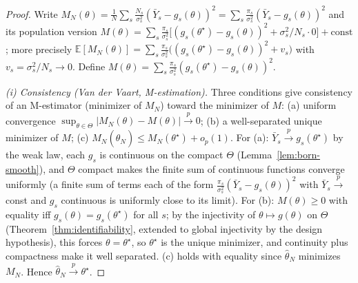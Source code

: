 \documentclass[aps,prresearch,reprint,superscriptaddress,nofootinbib,amsmath,amssymb]{revtex4-2}
\newcommand{\abs}[1]{\left\lvert #1 \right\rvert}
\begin{document}
\begin{proof}
Write $M_N(\theta)=\tfrac1N\sum_s\tfrac{N_s}{\sigma_s^2}(\bar Y_s-g_s(\theta))^2=\sum_s\tfrac{\pi_s}{\sigma_s^2}(\bar Y_s-g_s(\theta))^2$ and its population version $M(\theta)=\sum_s\tfrac{\pi_s}{\sigma_s^2}\bigl[(g_s(\theta^\star)-g_s(\theta))^2+\sigma_s^2/N_s\cdot 0\bigr]+\text{const}$; more precisely $\mathbb{E}[M_N(\theta)]=\sum_s\tfrac{\pi_s}{\sigma_s^2}\bigl((g_s(\theta^\star)-g_s(\theta))^2+v_s\bigr)$ with $v_s=\sigma_s^2/N_s\to0$. Define $M(\theta)=\sum_s\tfrac{\pi_s}{\sigma_s^2}(g_s(\theta^\star)-g_s(\theta))^2$.

\emph{(i) Consistency (Van der Vaart, M-estimation).} Three conditions give consistency of an M-estimator (minimizer of $M_N$) toward the minimizer of $M$: (a) uniform convergence $\sup_{\theta\in\Theta}\abs{M_N(\theta)-M(\theta)}\xrightarrow{p}0$; (b) a well-separated unique minimizer of $M$; (c) $M_N(\hat\theta_N)\leq M_N(\theta^\star)+o_p(1)$. For (a): $\bar Y_s\xrightarrow{p}g_s(\theta^\star)$ by the weak law, each $g_s$ is continuous on the compact $\Theta$ (Lemma~\ref{lem:born-smooth}), and $\Theta$ compact makes the finite sum of continuous functions converge uniformly (a finite sum of terms each of the form $\tfrac{\pi_s}{\sigma_s^2}(\bar Y_s-g_s(\theta))^2$ with $\bar Y_s\xrightarrow{p}$const and $g_s$ continuous is uniformly close to its limit). For (b): $M(\theta)\geq0$ with equality iff $g_s(\theta)=g_s(\theta^\star)$ for all $s$; by the injectivity of $\theta\mapsto g(\theta)$ on $\Theta$ (Theorem~\ref{thm:identifiability}, extended to global injectivity by the design hypothesis), this forces $\theta=\theta^\star$, so $\theta^\star$ is the unique minimizer, and continuity plus compactness make it well separated. (c) holds with equality since $\hat\theta_N$ minimizes $M_N$. Hence $\hat\theta_N\xrightarrow{p}\theta^\star$.


\end{proof}
\end{document}
